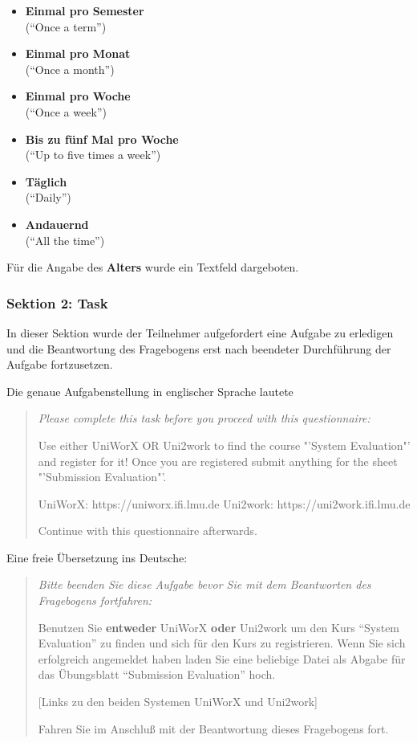 \documentclass[11pt,a4paper,twoside,ngerman]{article}
\begin{document}
\begin{itemize}
    \item \textbf{Einmal pro Semester} \\ ("`Once a term"')
    \item \textbf{Einmal pro Monat} \\ ("`Once a month"')
    \item \textbf{Einmal pro Woche} \\ ("`Once a week"')
    \item \textbf{Bis zu fünf Mal pro Woche} \\ ("`Up to five times a week"')
    \item \textbf{Täglich} \\ ("`Daily"')
    \item \textbf{Andauernd} \\ ("`All the time"')
\end{itemize}

\bigskip
\noindent
Für die Angabe des \textbf{Alters} wurde ein Textfeld dargeboten.

\subsubsection{Sektion 2: Task}
In dieser Sektion wurde der Teilnehmer aufgefordert eine Aufgabe zu erledigen und die Beantwortung des Fragebogens erst nach beendeter Durchführung der Aufgabe fortzusetzen.

Die genaue Aufgabenstellung in englischer Sprache lautete 
\begin{quote}
\itshape 
Please complete this task before you proceed with this questionnaire:

Use either UniWorX OR Uni2work to find the course "'System Evaluation"' and register for it!
Once you are registered submit anything for the sheet "'Submission Evaluation"'.

UniWorX: https://uniworx.ifi.lmu.de
Uni2work: https://uni2work.ifi.lmu.de

Continue with this questionnaire afterwards.
\end{quote}

\noindent
Eine freie Übersetzung ins Deutsche:
\begin{quote}
\itshape
Bitte beenden Sie diese Aufgabe bevor Sie mit dem Beantworten des Fragebogens fortfahren:

Benutzen Sie \textbf{entweder} UniWorX \textbf{oder} Uni2work um den Kurs "`System Evaluation"' zu finden und sich für den Kurs zu registrieren.
Wenn Sie sich erfolgreich angemeldet haben laden Sie eine beliebige Datei als Abgabe für das Übungsblatt "`Submission Evaluation"' hoch.

[Links zu den beiden Systemen UniWorX und Uni2work]

Fahren Sie im Anschluß mit der Beantwortung dieses Fragebogens fort.
\end{quote}
\end{document}
